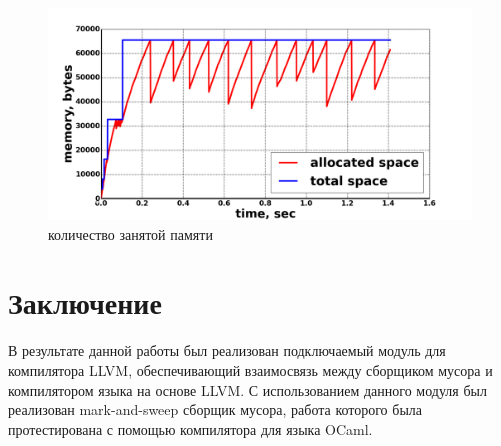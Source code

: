 \documentclass[14pt]{extarticle}
\begin{document}
\begin{figure}[H]
\caption{\label{pic:memory-with-gc}количество занятой памяти}
\includegraphics[width=1\linewidth]{parser-no-space.png}
\end{figure}
\section*{Заключение}
В результате данной работы был реализован подключаемый модуль для компилятора LLVM, обеспечивающий взаимосвязь между сборщиком мусора и компилятором языка на основе LLVM.  С использованием данного модуля был реализован mark-and-sweep сборщик мусора, работа которого была протестирована с помощью компилятора для языка OCaml. 

\pagebreak


\end{document}
